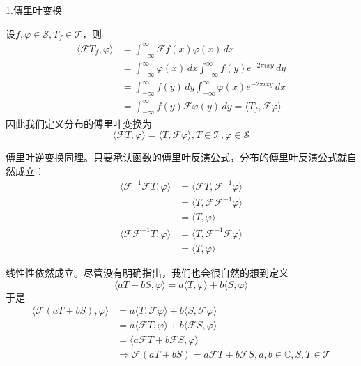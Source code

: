 \documentclass{ctexbook}
\begin{document}
\noindent 1.傅里叶变换

设$f,\varphi\in\mathcal{S} ,T_f\in\mathcal{T} $，则
\begin{align*}
    \langle\mathcal{F}T_f,\varphi\rangle & =\int_{-\infty}^{\infty}\mathcal{F}f(x)\varphi(x)\,dx                                       \\
                                         & =\int_{-\infty}^{\infty}\varphi(x)\,dx\int_{-\infty}^{\infty}f(y)e^{-2\pi ixy}\,dy          \\
                                         & =\int_{-\infty}^{\infty}f(y)\,dy\int_{-\infty}^{\infty}\varphi(x)e^{-2\pi ixy}\,dx          \\
                                         & =\int_{-\infty}^{\infty}f(y)\mathcal{F}\varphi(y)\,dy=\langle T_f,\mathcal{F}\varphi\rangle
\end{align*}
因此我们定义分布的傅里叶变换为
\begin{equation}
    \langle\mathcal{F}T,\varphi\rangle=\langle T,\mathcal{F}\varphi\rangle,T\in\mathcal{T} ,\varphi\in\mathcal{S}
\end{equation}

傅里叶逆变换同理。只要承认函数的傅里叶反演公式，分布的傅里叶反演公式就自然成立：
\begin{align*}
    \langle \mathcal{F} ^{-1}\mathcal{F} T,\varphi\rangle&=\langle \mathcal{F} T,\mathcal{F} ^{-1}\varphi\rangle\\
    &=\langle T,\mathcal{F} \mathcal{F} ^{-1}\varphi\rangle\\
    &=\langle T,\varphi\rangle\\
    \langle \mathcal{F} \mathcal{F} ^{-1}T,\varphi\rangle&=\langle T,\mathcal{F} ^{-1}\mathcal{F} \varphi\rangle\\
    &=\langle T,\varphi\rangle
\end{align*}

线性性依然成立。尽管没有明确指出，我们也会很自然的想到定义
\begin{equation}
    \langle aT+bS,\varphi\rangle=a\langle T,\varphi\rangle+b\langle S,\varphi\rangle
\end{equation}
于是\begin{align*}
    \langle \mathcal{F} (aT+bS),\varphi\rangle & =a\langle T,\mathcal{F} \varphi\rangle+b\langle S,\mathcal{F} \varphi\rangle                     \\
                                               & =a\langle \mathcal{F} T,\varphi\rangle+b\langle \mathcal{F} S,\varphi\rangle                     \\
                                               & =\langle a\mathcal{F} T+b\mathcal{F} S,\varphi\rangle                                            \\
                                               & \Rightarrow \mathcal{F} (aT+bS)=a\mathcal{F} T+b\mathcal{F} S,a,b\in\mathbb{C},S,T\in\mathcal{T}
\end{align*}
\end{document}
